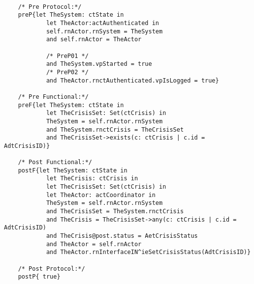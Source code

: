 	\scriptsize
	\vspace{0.5cm}
	\begin{lstlisting}[style=MessirStyle,firstnumber=auto,captionpos=b,caption={\msrmessir (MCL-oriented) specification of the operation \emph{oeSetCrisisStatus}.},label=OM-actCoordinator-oeSetCrisisStatus-MCL-LST]

	/* Pre Protocol:*/ 
	preP{let TheSystem: ctState in
	  		let TheActor:actAuthenticated in
	  		self.rnActor.rnSystem = TheSystem
	  		and self.rnActor = TheActor
	  
			/* PreP01 */
	  		and TheSystem.vpStarted = true
			/* PreP02 */
	  		and TheActor.rnctAuthenticated.vpIsLogged = true}
	
	/* Pre Functional:*/
	preF{let TheSystem: ctState in
			let TheCrisisSet: Set(ctCrisis) in
			TheSystem = self.rnActor.rnSystem
			and TheSystem.rnctCrisis = TheCrisisSet
			and TheCrisisSet->exists(c: ctCrisis | c.id = AdtCrisisID)}
	
	/* Post Functional:*/ 
	postF{let TheSystem: ctState in
			let TheCrisis: ctCrisis in
			let TheCrisisSet: Set(ctCrisis) in
			let TheActor: actCoordinator in
			TheSystem = self.rnActor.rnSystem
			and TheCrisisSet = TheSystem.rnctCrisis
			and TheCrisis = TheCrisisSet->any(c: ctCrisis | c.id = AdtCrisisID)
			and TheCrisis@post.status = AetCrisisStatus
			and TheActor = self.rnActor
			and TheActor.rnInterfaceIN^ieSetCrisisStatus(AdtCrisisID)}
	
	/* Post Protocol:*/ 
	postP{ true}
	
	\end{lstlisting}
	\normalsize 
	
	
	
	





